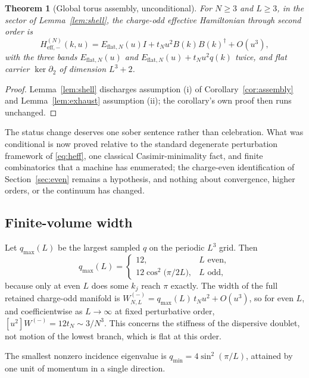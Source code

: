 \documentclass[11pt]{article}
\theoremstyle{plain}
\newtheorem{theorem}{Theorem}
\theoremstyle{definition}
\theoremstyle{remark}
\newcommand{\chk}[1]{}
\newcommand{\dg}{^{\dagger}}
\begin{document}
\begin{theorem}[Global torus assembly, unconditional]\label{thm:assembly}
For $N\ge3$ and $L\ge3$, in the sector of Lemma~\ref{lem:shell}, the
charge-odd effective Hamiltonian through second order is
\[
  H^{(N)}_{\mathrm{eff},-}(k,u)
  =E_{\mathrm{flat},N}(u)I+t_Nu^2B(k)B(k)\dg+O(u^3),
\]
with the three bands $E_{\mathrm{flat},N}(u)$ and
$E_{\mathrm{flat},N}(u)+t_Nu^2q(k)$ twice, and flat carrier
$\ker\partial_2$ of dimension $L^3+2$.
\end{theorem}

\begin{proof}
Lemma~\ref{lem:shell} discharges assumption (i) of
Corollary~\ref{cor:assembly} and Lemma~\ref{lem:exhaust} assumption (ii);
the corollary's own proof then runs unchanged.
\end{proof}

The status change deserves one sober sentence rather than celebration. What
was conditional is now proved relative to the standard degenerate
perturbation framework of \eqref{eq:heff}, one classical Casimir-minimality
fact, and finite combinatorics that a machine has enumerated; the charge-even
identification of Section~\ref{sec:even} remains a hypothesis, and nothing
about convergence, higher orders, or the continuum has changed.

\subsection{Finite-volume width}

Let $q_{\max}(L)$ be the largest sampled $q$ on the periodic $L^3$ grid. Then
\begin{equation}\label{eq:qmax}
  q_{\max}(L)=
  \begin{cases}
    12, & L\text{ even},\\[2pt]
    12\cos^2\!\bigl(\pi/2L\bigr), & L\text{ odd},
  \end{cases}
\end{equation}
because only at even $L$ does some $k_j$ reach $\pi$ exactly. The width of the
full retained charge-odd manifold is $W^{(-)}_{N,L}=q_{\max}(L)\,t_Nu^2+O(u^3)$,
so for even $L$, and coefficientwise as $L\to\infty$ at fixed perturbative
order, $[u^2]W^{(-)}=12t_N\sim3/N^3$.
This concerns the stiffness of the dispersive doublet, not motion of the
lowest branch, which is flat at this order.
\chk{the zone maximum of q is 12 only at even L}

The smallest nonzero incidence eigenvalue is $q_{\min}=4\sin^2(\pi/L)$,
attained by one unit of momentum in a single direction.
\chk{q\_min on the L-torus grid is 4 sin\^{}2(pi/L)}
\end{document}
